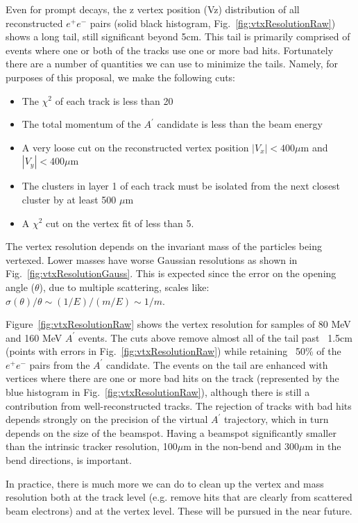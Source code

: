 Even for prompt decays, the z vertex position (Vz) distribution of all reconstructed $e^+e^-$ pairs
  (solid black histogram, Fig.~\ref{fig:vtxResolutionRaw}) shows a long tail, still significant beyond 5cm.   
This tail is primarily comprised of events where one or both of the tracks use one or 
more bad hits.  Fortunately there are a number of quantities we can use to minimize the tails.  
Namely, for purposes of this proposal, we make the following cuts:

\begin{itemize}
\item The $\chi^2$  of each track is less than 20
\item The total momentum of the $A^\prime$ candidate is less than the beam energy
\item A very loose cut on the reconstructed vertex position $|V_x|<400\mu$m and $|V_y|<400\mu$m
\item The clusters in layer 1 of each track must be isolated from the next closest cluster by at least 500 $\mu$m 
\item A $\chi^2$ cut on the vertex fit of less than 5.
\end{itemize}

The vertex resolution depends on the invariant mass of the particles being vertexed. 
Lower masses have worse Gaussian resolutions as shown in Fig.~\ref{fig:vtxResolutionGauss}.  This is expected 
since the error on the opening angle ($\theta$), due to multiple scattering, scales like: 
 $\sigma (\theta )/\theta \sim (1/E)/(m/E) \sim 1/m$.
 
Figure~\ref{fig:vtxResolutionRaw} shows the vertex resolution for samples of 80 MeV and 160 MeV $A^\prime$ events. 
The cuts above remove almost all of the tail past ~1.5cm (points with errors in Fig.~\ref{fig:vtxResolutionRaw}) 
while retaining ~50\% of the $e^+e^-$ pairs from the $A^\prime$ candidate. The events on the tail are 
enhanced with vertices where there are one or more bad hits on the track (represented by the 
blue histogram in Fig.~\ref{fig:vtxResolutionRaw}), although there is still a contribution from well-reconstructed 
tracks.  The rejection of tracks with bad hits depends strongly on the precision of the virtual $A^\prime$ 
trajectory, which in turn depends on the size of the beamspot. Having a beamspot significantly 
smaller than the intrinsic tracker resolution, 100$\mu$m in the non-bend and 300$\mu$m in 
the bend directions, is important.  

In practice, there is much more we can do to clean up the vertex and mass resolution both at 
the track level (e.g. remove hits that are clearly from scattered beam electrons) and at 
the vertex level.  These will be pursued in the near future.


